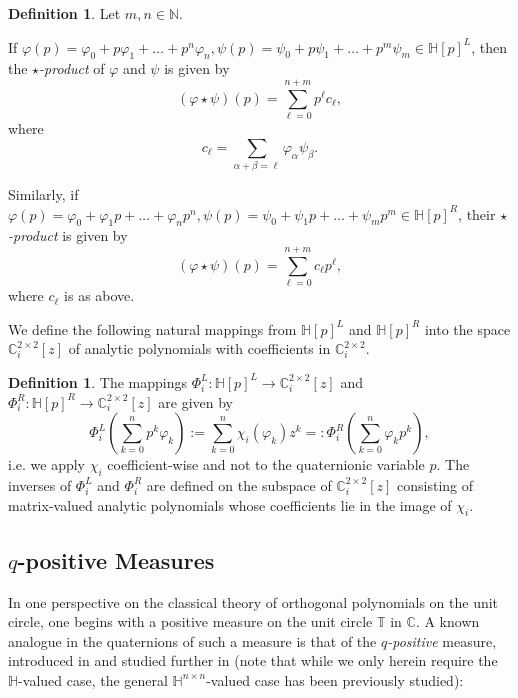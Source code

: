 \documentclass[11pt,reqno]{amsart}
\def\a{\alpha}
\def\b{\beta}
\def\x{\chi}
\def\p{\varphi}
\def\q{\psi}
\def\P{\Phi}
\def\NN{\mathbb{N}}
\def\CC{\mathbb{C}}
\def\TT{\mathbb{T}}
\def\HH{\mathbb{H}}
\theoremstyle{definition}
\newtheorem{definition}[theorem]{Definition}
\numberwithin{equation}{section}
\begin{document}
\begin{definition}
	Let \(m, n \in \NN\).

	If \(\p(p) = \p_0 + p\p_1 + \ldots + p^n \p_n, \q(p) = \q_0 + p \q_1 + \ldots + p^m \q_m \in \HH[p]^L\), then the \emph{\(\star\)-product} of \(\p\) and \(\q\) is given by
	\[
		(\p \star \q)(p) = \sum_{\ell = 0}^{n+m} p^{\ell} c_\ell,
	\]
	where
	\[
		c_{\ell} = \sum_{\a + \b = \ell} \p_\a \q_\b.
	\]

	Similarly, if \(\p(p) = \p_0 + \p_1 p + \ldots + \p_n p^n, \q(p) = \q_0 + \q_1 p + \ldots + \q_m p^m \in \HH[p]^R\), their \emph{\(\star\)-product} is given by
	\[
		(\p \star \q)(p) = \sum_{\ell = 0}^{n+m} c_\ell p^{\ell},
	\]
	where \(c_\ell\) is as above.
\end{definition}

We define the following natural mappings from \(\HH[p]^L\) and \(\HH[p]^R\) into the space \(\CC_i^{2\times2}[z]\) of analytic polynomials with coefficients in \(\CC_i^{2\times2}\).
\begin{definition}
	The mappings \(\P_i^L : \HH[p]^L \to \CC_i^{2\times2}[z]\) and \(\P_i^R : \HH[p]^R \to \CC_i^{2\times2}[z]\) are given by
	\[
	    \P_i^L\left(\sum_{k=0}^{n} p^k \p_k\right) := \sum_{k=0}^n \x_i(\p_k) z^k =: \P_i^R\left(\sum_{k=0}^{n} \p_k p^k\right),
	\]
    i.e. we apply \(\x_i\) coefficient-wise and not to the quaternionic variable \(p\). The inverses of \(\P_i^L\) and \(\P_i^R\) are defined on the subspace of \(\CC_i^{2\times 2}[z]\) consisting of matrix-valued analytic polynomials whose coefficients lie in the image of \(\x_i\).
\end{definition}

\subsection{\(q\)-positive Measures}

In one perspective on the classical theory of orthogonal polynomials on the unit circle, one begins with a positive measure on the unit circle \(\TT\) in \(\CC\). A known analogue in the quaternions of such a measure is that of the \emph{\(q\)-positive} measure, introduced in \cite{ACKS15} and studied further in \cite{ABCKS16} (note that while we only herein require the \(\HH\)-valued case, the general \(\HH^{n\times n}\)-valued case has been previously studied):
\end{document}
